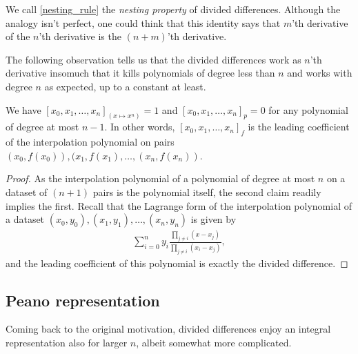 We call \ref{nesting_rule} the \textit{nesting property} of divided differences. Although the analogy isn't perfect, one could think that this identity says that $m$'th derivative of the $n$'th derivative is the $(n + m)$'th derivative. 

The following observation tells us that the divided differences work as $n$'th derivative insomuch that it kills polynomials of degree less than $n$ and works with degree $n$ as expected, up to a constant at least.

\begin{prop}\label{lagrange_divided}
We have $[x_{0}, x_{1}, \ldots, x_{n}]_{(x \mapsto x^{n})} = 1$ and $[x_{0}, x_{1}, \ldots, x_{n}]_{p} = 0$ for any polynomial of degree at most $n - 1$. In other words, $[x_{0}, x_{1}, \ldots, x_{n}]_{f}$ is the leading coefficient of the interpolation polynomial on pairs $(x_{0}, f(x_{0})), (x_{1}, f(x_{1}), \ldots, (x_{n}, f(x_{n}))$.
\end{prop}
\begin{proof}
	As the interpolation polynomial of a polynomial of degree at most $n$ on a dataset of $(n + 1)$ pairs is the polynomial itself, the second claim readily implies the first. Recall that the Lagrange form of the interpolation polynomial of a dataset $(x_{0}, y_{0}), (x_{1}, y_{1}), \ldots, (x_{n}, y_{n})$ is given by
	\begin{align*}
		\sum_{i = 0}^{n} y_{i} \frac{\prod_{j \neq i}(x - x_{j})}{\prod_{j \neq i}(x_{i} - x_{j})},
	\end{align*}
	and the leading coefficient of this polynomial is exactly the divided difference.
\end{proof}

\subsection{Peano representation}

Coming back to the original motivation, divided differences enjoy an integral representation also for larger $n$, albeit somewhat more complicated.

